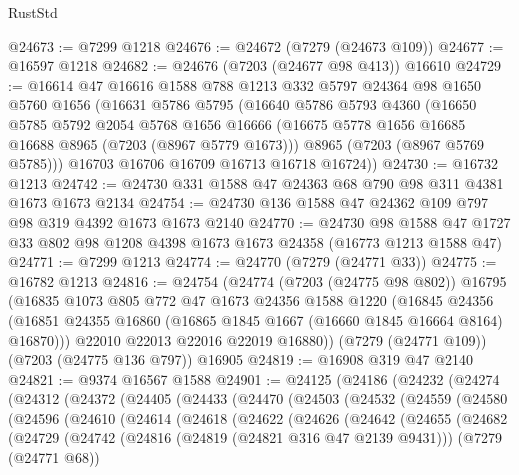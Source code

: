 \begin{lexlean}{RustStd}
\begin{coremodule}
@24673 := @7299 @1218
@24676 := @24672 (@7279 (@24673 @109))
@24677 := @16597 @1218
@24682 := @24676 (@7203 (@24677 @98 @413)) @16610
@24729 := @16614
    @47
    @16616
    @1588
    @788
    @1213
    @332
    @5797
    @24364
    @98
    @1650
    @5760
    @1656
    (@16631
      @5786
      @5795
      (@16640
        @5786
        @5793
        @4360
        (@16650
          @5785
          @5792
          @2054
          @5768
          @1656
          @16666
          (@16675 @5778 @1656 @16685 @16688 @8965 (@7203 (@8967 @5779 @1673)))
          @8965
          (@7203 (@8967 @5769 @5785)))
        @16703
        @16706
        @16709
        @16713
        @16718
        @16724))
@24730 := @16732 @1213
@24742 := @24730 @331 @1588 @47 @24363 @68 @790 @98 @311 @4381 @1673 @1673 @2134
@24754 := @24730 @136 @1588 @47 @24362 @109 @797 @98 @319 @4392 @1673 @1673 @2140
@24770 := @24730
    @98
    @1588
    @47
    @1727
    @33
    @802
    @98
    @1208
    @4398
    @1673
    @1673
    @24358
    (@16773 @1213 @1588 @47)
@24771 := @7299 @1213
@24774 := @24770 (@7279 (@24771 @33))
@24775 := @16782 @1213
@24816 := @24754
    (@24774
      (@7203 (@24775 @98 @802))
      @16795
      (@16835
        @1073
        @805
        @772
        @47
        @1673
        @24356
        @1588
        @1220
        (@16845
          @24356
          (@16851 @24355 @16860 (@16865 @1845 @1667 (@16660 @1845 @16664 @8164) @16870)))
        @22010
        @22013
        @22016
        @22019
        @16880))
    (@7279 (@24771 @109))
    (@7203 (@24775 @136 @797))
    @16905
@24819 := @16908 @319 @47 @2140
@24821 := @9374 @16567 @1588
@24901 := @24125
    (@24186
      (@24232
        (@24274
          (@24312
            (@24372
              (@24405
                (@24433
                  (@24470
                    (@24503
                      (@24532
                        (@24559
                          (@24580
                            (@24596
                              (@24610
                                (@24614
                                  (@24618
                                    (@24622
                                      (@24626
                                        (@24642
                                          (@24655
                                            (@24682
                                              (@24729
                                                (@24742
                                                  (@24816 (@24819 (@24821 @316 @47 @2139 @9431)))
                                                  (@7279 (@24771 @68))

\end{coremodule}
\end{lexlean}
